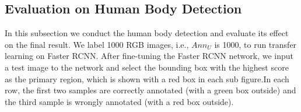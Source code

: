 \documentclass[10pt,twocolumn,letterpaper]{article}
\begin{document}

\subsection{Evaluation on Human Body Detection}
In this subsection we conduct the human body detection and evaluate its effect on the final result. We label 1000 RGB images, i.e., $Ann_{U}$ is 1000, to run transfer learning on Faster RCNN. After fine-tuning the Faster RCNN network, we input a test image to the network and select the bounding box with the highest score as the primary region, which is shown with a red box in each sub figure.In each row, the first two samples are correctly annotated (with a green box outside) and the third sample is wrongly annotated (with a red box outside). 
\end{document}
